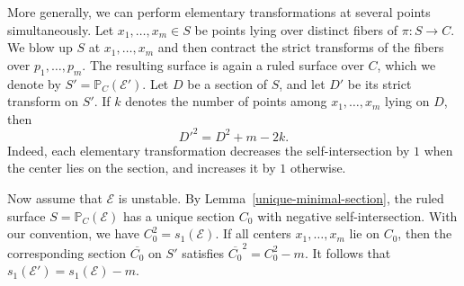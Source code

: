 \documentclass[reqno]{amsart}
\theoremstyle{definition}
\newcommand{\PP}{\mathbb{P}}
\newcommand{\Ee}{\mathcal{E}}
\begin{document}
More generally, we can perform elementary transformations at several points simultaneously.
Let $x_1,\ldots,x_m\in S$ be points lying over distinct fibers of $\pi: S\to C$.
We blow up $S$ at $x_1,\ldots,x_m$ and then contract the strict transforms of the fibers over $p_1,\ldots,p_m$.
The resulting surface is again a ruled surface over $C$, which we denote by $S'=\PP_C(\Ee')$.
Let $D$ be a section of $S$, and let $D'$ be its strict transform on $S'$.
If $k$ denotes the number of points among $x_1,\ldots,x_m$ lying on $D$, then
\[
D'^2=D^2+m-2k.
\]
Indeed, each elementary transformation decreases the self-intersection by $1$ when the center lies on the section, and increases it by $1$ otherwise.

Now assume that $\Ee$ is unstable.
By Lemma~\ref{unique-minimal-section}, the ruled surface $S=\PP_C(\Ee)$ has a unique section $C_0$ with negative self-intersection.
With our convention, we have $C_0^2=s_1(\Ee)$.
If all centers $x_1,\ldots,x_m$ lie on $C_0$, then the corresponding section $\overline{C_0}$ on $S'$ satisfies $\overline{C_0}^2=C_0^2-m$.
It follows that $s_1(\Ee')=s_1(\Ee)-m$.
\end{document}
